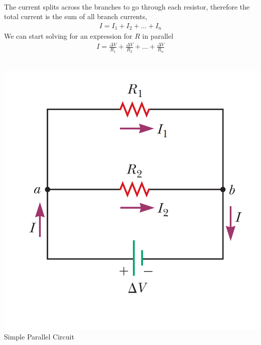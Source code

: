 \documentclass[12pt, titlepage, oneside]{article}
\begin{document}
			\noindent{}\\
		
		The current splits across the branches to go through each resistor, therefore the total current is the sum of all branch currents,
		\begin{align*}
		I = I_1 + I_2 + ... + I_n
		\end{align*}
		We can start solving for an expression for $R$ in parallel
		\begin{align*}
		I = \frac{\Delta V}{R_1} + \frac{\Delta V}{R_2} + ... + \frac{\Delta V}{R_n}
		\end{align*}
		\\
			\noindent{}
				\begin{center}			
			\includegraphics[scale=0.4]{3.png} Simple Parallel Circuit
		\end{center}
	
\end{document}
